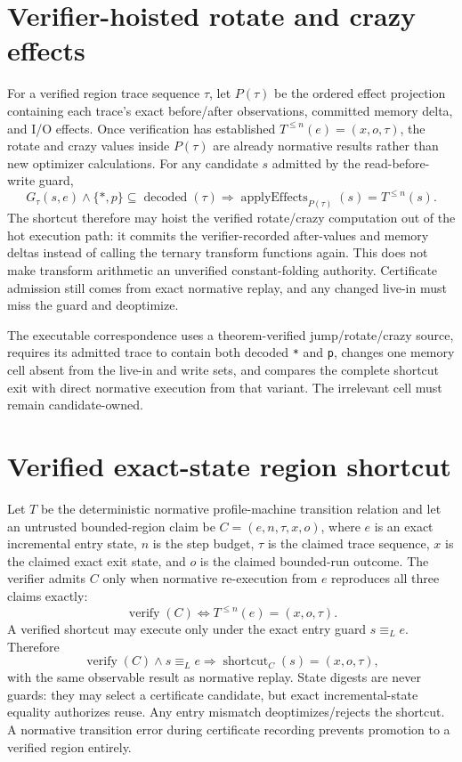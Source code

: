 \documentclass{article}
\begin{document}
\section{Verifier-hoisted rotate and crazy effects}

For a verified region trace sequence $\tau$, let $P(\tau)$ be the ordered effect
projection containing each trace's exact before/after observations, committed
memory delta, and I/O effects. Once verification has established
$T^{\leq n}(e)=(x,o,\tau)$, the rotate and crazy values inside $P(\tau)$ are
already normative results rather than new optimizer calculations. For any
candidate $s$ admitted by the read-before-write guard,
\begin{equation}
  G_{\tau}(s,e)\land
  \{*,p\}\subseteq\operatorname{decoded}(\tau)
  \Longrightarrow
  \operatorname{applyEffects}_{P(\tau)}(s)=T^{\leq n}(s).
  \label{eq:state-graph-verified-transform-hoist}
\end{equation}
The shortcut therefore may hoist the verified rotate/crazy computation out of
the hot execution path: it commits the verifier-recorded after-values and memory
deltas instead of calling the ternary transform functions again. This does not
make transform arithmetic an unverified constant-folding authority. Certificate
admission still comes from exact normative replay, and any changed live-in must
miss the guard and deoptimize.

The executable correspondence uses a theorem-verified jump/rotate/crazy source,
requires its admitted trace to contain both decoded \texttt{*} and \texttt{p},
changes one
memory cell absent from the live-in and write sets, and compares the complete
shortcut exit with direct normative execution from that variant. The irrelevant
cell must remain candidate-owned.

\section{Verified exact-state region shortcut}

Let $T$ be the deterministic normative profile-machine transition relation and
let an untrusted bounded-region claim be
$C=(e,n,\tau,x,o)$, where $e$ is an exact incremental entry state, $n$ is the
step budget, $\tau$ is the claimed trace sequence, $x$ is the claimed exact exit
state, and $o$ is the claimed bounded-run outcome. The verifier admits $C$ only
when normative re-execution from $e$ reproduces all three claims exactly:
\begin{equation}
  \operatorname{verify}(C)
  \Longleftrightarrow
  T^{\leq n}(e)=(x,o,\tau).
  \label{eq:state-graph-exact-region-certificate}
\end{equation}
A verified shortcut may execute only under the exact entry guard
$s\equiv_L e$. Therefore
\[
  \operatorname{verify}(C)\land s\equiv_L e
  \Longrightarrow
  \operatorname{shortcut}_C(s)=(x,o,\tau),
\]
with the same observable result as normative replay. State digests are never
guards: they may select a certificate candidate, but exact incremental-state
equality authorizes reuse. Any entry mismatch deoptimizes/rejects the shortcut.
A normative transition error during certificate recording prevents promotion to
a
verified region entirely.
\end{document}
